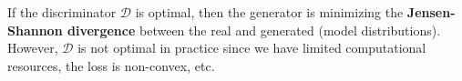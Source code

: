  If the discriminator $\mathcal{D}$ is optimal, then the generator is minimizing the \textbf{Jensen-Shannon divergence} between the real and generated (model distributions). However, $\mathcal{D}$ is not optimal in practice since we have limited computational resources, the loss is non-convex, etc. 

